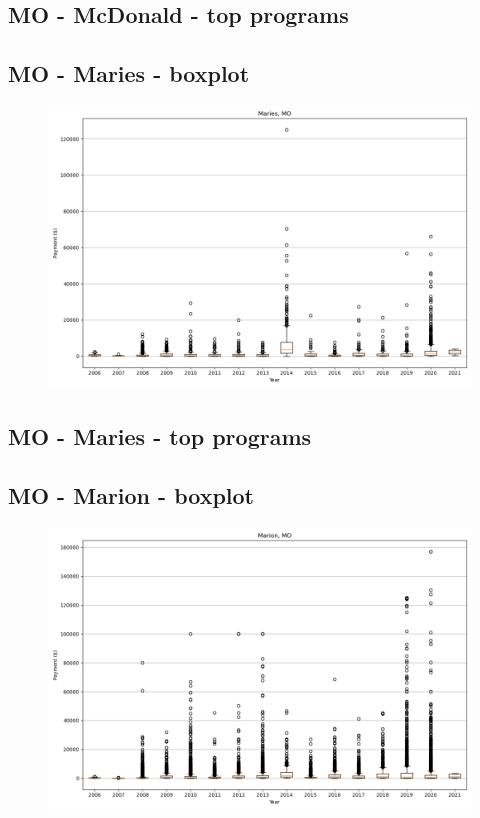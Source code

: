 \subsection*{MO - McDonald - top programs}

\newpage
\subsection*{MO - Maries - boxplot}
\begin{figure}[h]
\centering
\includegraphics[width=7in]{../output/boxplots/counties/Maries-MO_boxplot.png}
\end{figure}


\subsection*{MO - Maries - top programs}

\newpage
\subsection*{MO - Marion - boxplot}
\begin{figure}[h]
\centering
\includegraphics[width=7in]{../output/boxplots/counties/Marion-MO_boxplot.png}
\end{figure}


